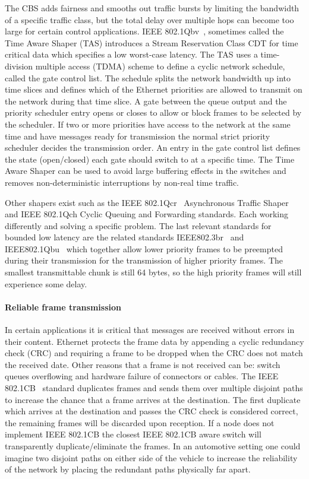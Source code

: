 The CBS adds fairness and smooths out traffic bursts by limiting the bandwidth of a specific traffic class, but the total delay over multiple hops can become too large for certain control applications. IEEE 802.1Qbv~\cite{IEEE8021Qbv}, sometimes called the Time Aware Shaper (TAS) introduces a Stream Reservation Class CDT for time critical data which specifies a low worst-case latency. The TAS uses a time-division multiple access (TDMA) scheme to define a cyclic network schedule, called the gate control list. The schedule splits the network bandwidth up into time slices and defines which of the Ethernet priorities are allowed to transmit on the network during that time slice. A gate between the queue output and the priority scheduler entry opens or closes to allow or block frames to be selected by the scheduler. If two or more priorities have access to the network at the same time and have messages ready for transmission the normal strict priority scheduler decides the transmission order. An entry in the gate control list defines the state (open/closed) each gate should switch to at a specific time. The Time Aware Shaper can be used to avoid large buffering effects in the switches and removes non-deterministic interruptions by non-real time traffic.

Other shapers exist such as the IEEE 802.1Qcr~\cite{IEEE8021Qcr} Asynchronous Traffic Shaper and IEEE 802.1Qch\cite{IEEE8021Qch} Cyclic Queuing and Forwarding standards. Each working differently and solving a specific problem. The last relevant standards for bounded low latency are the related standards IEEE802.3br~\cite{IEEE8023br} and IEEE802.1Qbu~\cite{IEEE8021Qbu} which together allow lower priority frames to be preempted during their transmission for the transmission of higher priority frames. The smallest transmittable chunk is still 64 bytes, so the high priority frames will still experience some delay.

\paragraph{Reliable frame transmission} In certain applications it is critical that messages are received without errors in their content. Ethernet protects the frame data by appending a cyclic redundancy check (CRC) and requiring a frame to be dropped when the CRC does not match the received date. Other reasons that a frame is not received can be: switch queues overflowing and hardware failure of connectors or cables. The IEEE 802.1CB~\cite{IEEE8021CB} standard duplicates frames and sends them over multiple disjoint paths to increase the chance that a frame arrives at the destination. The first duplicate which arrives at the destination and passes the CRC check is considered correct, the remaining frames will be discarded upon reception. If a node does not implement IEEE 802.1CB the closest IEEE 802.1CB aware switch will transparently duplicate/eliminate the frames. In an automotive setting one could imagine two disjoint paths on either side of the vehicle to increase the reliability of the network by placing the redundant paths physically far apart. 

